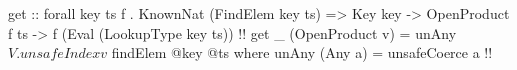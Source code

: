 \begin{code}
get
    :: forall key ts f
     . KnownNat (FindElem key ts)
    => Key key
    -> OpenProduct f ts
    -> f (Eval (LookupType key ts)) !!
get _ (OpenProduct v) =
    unAny $ V.unsafeIndex v $ findElem @key @ts
  where
    unAny (Any a) = unsafeCoerce a  !!
\end{code}
